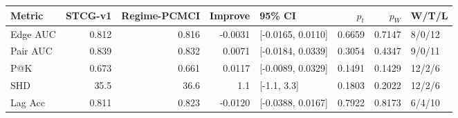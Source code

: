 \begin{tabular}{lrrrlrrl}
\toprule
Metric & STCG-v1 & Regime-PCMCI & Improve & 95\% CI & $p_t$ & $p_W$ & W/T/L \\
\midrule
Edge AUC & 0.812 & 0.816 & -0.0031 & [-0.0165, 0.0110] & 0.6659 & 0.7147 & 8/0/12 \\
Pair AUC & 0.839 & 0.832 & 0.0071 & [-0.0184, 0.0339] & 0.3054 & 0.4347 & 9/0/11 \\
P@K & 0.673 & 0.661 & 0.0117 & [-0.0089, 0.0329] & 0.1491 & 0.1429 & 12/2/6 \\
SHD & 35.5 & 36.6 & 1.1 & [-1.1, 3.3] & 0.1803 & 0.2022 & 12/2/6 \\
Lag Acc & 0.811 & 0.823 & -0.0120 & [-0.0388, 0.0167] & 0.7922 & 0.8173 & 6/4/10 \\
\bottomrule
\end{tabular}
